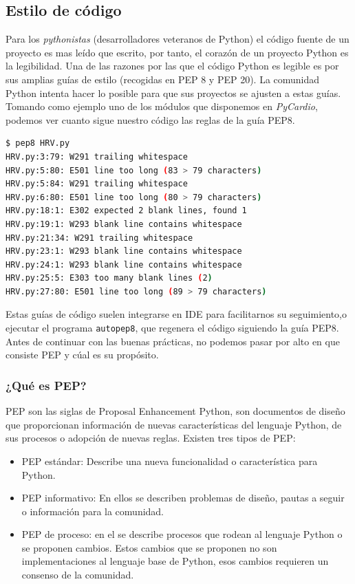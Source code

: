 \subsection*{Estilo de código}
\label{subsec:stylePython}
Para los \emph{pythonistas} (desarrolladores veteranos de Python) el código fuente de un proyecto es mas leído que escrito, por tanto, el corazón de un proyecto Python es la legibilidad. Una de las razones por las que el código Python es legible es por sus amplias guías de estilo (recogidas en PEP 8 y PEP 20). La comunidad Python intenta hacer lo posible para que sus proyectos se ajusten a estas guías. Tomando como ejemplo uno de los módulos que disponemos en \emph{PyCardio}, podemos ver cuanto sigue nuestro código las reglas de la guía PEP8. \\ 
\begin{lstlisting}[language=sh, caption=Ejemplo de PEP8 con \emph{PyCardio},label=pep8]
$ pep8 HRV.py
HRV.py:3:79: W291 trailing whitespace
HRV.py:5:80: E501 line too long (83 > 79 characters)
HRV.py:5:84: W291 trailing whitespace
HRV.py:6:80: E501 line too long (80 > 79 characters)
HRV.py:18:1: E302 expected 2 blank lines, found 1
HRV.py:19:1: W293 blank line contains whitespace
HRV.py:21:34: W291 trailing whitespace
HRV.py:23:1: W293 blank line contains whitespace
HRV.py:24:1: W293 blank line contains whitespace
HRV.py:25:5: E303 too many blank lines (2)
HRV.py:27:80: E501 line too long (89 > 79 characters)
\end{lstlisting}
Estas guías de código suelen integrarse en IDE para facilitarnos su seguimiento,o ejecutar el programa \texttt{autopep8}, que regenera el código siguiendo la guía PEP8. Antes de continuar con las buenas prácticas, no podemos pasar por alto en que consiste PEP y cúal es su propósito. \\
\subsubsection*{¿Qué es PEP?}
PEP son las siglas de Proposal Enhancement Python, son documentos de diseño que proporcionan información de nuevas características del lenguaje Python, de sus procesos o adopción de nuevas reglas. Existen tres tipos de PEP:
\begin{itemize}
    \item PEP estándar: Describe una nueva funcionalidad o característica para Python. 
    \item PEP informativo: En ellos se describen problemas de diseño, pautas a seguir o información para la comunidad.
    \item PEP de proceso: en el se describe procesos que rodean al lenguaje Python o se proponen cambios. Estos cambios que se proponen no son implementaciones al lenguaje base de Python, esos cambios requieren un consenso de la comunidad. 
\end{itemize}

